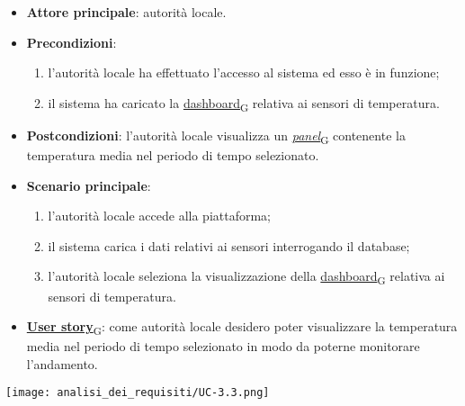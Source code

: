 \newpage

\begin{itemize}
	\item \textbf{Attore principale}: autorità locale.
	\item \textbf{Precondizioni}:
	      \begin{enumerate}
		      \item l'autorità locale ha effettuato l'accesso al sistema ed esso è in funzione;
		      \item il sistema ha caricato la \href{https://7last.github.io/docs/rtb/documentazione-interna/glossario\#dashboard}{dashboard\textsubscript{G}} relativa ai sensori di temperatura.
	      \end{enumerate}
	\item \textbf{Postcondizioni}: l'autorità locale visualizza un \href{https://7last.github.io/docs/rtb/documentazione-interna/glossario\#panel}{\textit{panel}\textsubscript{G}} contenente la temperatura media nel periodo di tempo selezionato.
	\item \textbf{Scenario principale}:
	      \begin{enumerate}
		      \item l'autorità locale accede alla piattaforma;
		      \item il sistema carica i dati relativi ai sensori interrogando il database;
		      \item l'autorità locale seleziona la visualizzazione della \href{https://7last.github.io/docs/rtb/documentazione-interna/glossario\#dashboard}{dashboard\textsubscript{G}} relativa ai sensori di temperatura.
	      \end{enumerate}
	\item \href{https://7last.github.io/docs/rtb/documentazione-interna/glossario\#user-story}{\textbf{User story}\textsubscript{G}}: come autorità locale desidero poter visualizzare la temperatura media nel periodo di tempo selezionato
	      in modo da poterne monitorare l'andamento.
\end{itemize}
\begin{center}
	\texttt{[image: analisi\_dei\_requisiti/UC-3.3.png]}
\end{center}

